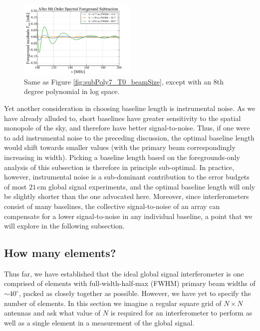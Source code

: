 \documentclass[twocolumn,apj,numberedappendix]{emulateapj}
\newcommand{\acl}[1]{{\color{red} \textbf{[ACL:  #1]}}}
\begin{document}
\begin{figure}[h]
	\centering
	\includegraphics[width=0.50\textwidth]{figures/subPoly8_T0_beamSize.pdf}
	\caption{Same as Figure \ref{fig:subPoly7_T0_beamSize}, except with an $8$th degree polynomial in log space.}
	\label{fig:subPoly8_T0_beamSize}
\end{figure}


Yet another consideration in choosing baseline length is instrumental noise. As we have already alluded to, short baselines have greater sensitivity to the spatial monopole of the sky, and therefore have better signal-to-noise. Thus, if one were to add instrumental noise to the preceding discussion, the optimal baseline length would shift towards smaller values (with the primary beam correspondingly increasing in width). Picking a baseline length based on the foregrounds-only analysis of this subsection is therefore in principle sub-optimal. In practice, however, instrumental noise is a sub-dominant contribution to the error budgets of most $21\,\textrm{cm}$ global signal experiments, and the optimal baseline length will only be slightly shorter than the one advocated here. Moreover, since interferometers consist of many baselines, the collective signal-to-noise of an array can compensate for a lower signal-to-noise in any individual baseline, a point that we will explore in the following subsection.

\subsection{How many elements?}
\label{sec:numElems}
Thus far, we have established that the ideal global signal interferometer is one comprised of elements with full-width-half-max (FWHM) primary beam widths of $\sim40^\circ$, packed as closely together as possible. However, we have yet to specify the number of elements. In this section we imagine a regular square grid of $N \times N$ antennas and ask what value of $N$ is required for an interferometer to perform as well as a single element in a measurement of the global signal.
\end{document}
